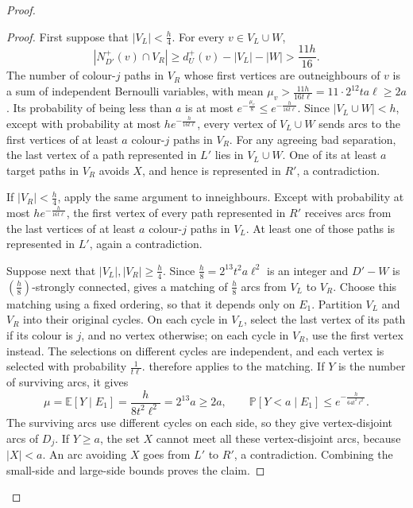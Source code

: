 \documentclass[11pt,a4paper]{article}
\theoremstyle{remark}
\numberwithin{equation}{section}
\newcommand{\Prob}{\mathbb{P}}
\newcommand{\E}{\mathbb{E}}
\begin{document}
\begin{proof}
\begin{proof}
			First suppose that $|V_L|<\frac{h}{4}$.
			For every $v\in V_L\cup W$,
			\[
			|N_{D'}^+(v)\cap V_R|\ge d_U^+(v)-|V_L|-|W|>\frac{11h}{16}.
			\]
			The number of colour-$j$ paths in $V_R$ whose first vertices are outneighbours
			of $v$ is a sum of independent Bernoulli variables, with mean
			$\mu_v>\frac{11h}{16t\ell}=11\cdot2^{12}ta\ell\ge2a$.
			Its probability of being less than $a$ is at most
			$e^{-\frac{\mu_v}{8}}\le e^{-\frac{h}{16t\ell}}$.
			Since $|V_L\cup W|<h$, except with probability at most $he^{-\frac{h}{16t\ell}}$,
			every vertex of $V_L\cup W$ sends arcs to the first vertices of at least $a$
			colour-$j$ paths in $V_R$.
			For any agreeing bad separation, the last vertex of a path represented in
			$L'$ lies in $V_L\cup W$.
			One of its at least $a$ target paths in $V_R$ avoids $X$, and hence is
			represented in $R'$, a contradiction.
			
			If $|V_R|<\frac{h}{4}$, apply the same argument to inneighbours.
			Except with probability at most $he^{-\frac{h}{16t\ell}}$, the first vertex of every
			path represented in $R'$ receives arcs from the last vertices of at least $a$
			colour-$j$ paths in $V_L$.
			At least one of those paths is represented in $L'$, again a contradiction.
			
			Suppose next that $|V_L|,|V_R|\ge \frac{h}{4}$.
			Since $\frac{h}{8}=2^{13}t^2a\ell^2$ is an integer and $D'-W$ is $(\frac{h}{8})$-strongly
			connected,  gives a matching of $\frac{h}{8}$ arcs from $V_L$ to $V_R$.
			Choose this matching using a fixed ordering, so that it depends only on
			$E_1$.
			Partition $V_L$ and $V_R$ into their original cycles.
			On each cycle in $V_L$, select the last vertex of its path if its colour is $j$,
			and no vertex otherwise; on each cycle in $V_R$, use the first vertex instead.
			The selections on different cycles are independent, and each vertex is selected
			with probability $\frac{1}{t\ell}$.
			 therefore applies to the matching.
			If $Y$ is the number of surviving arcs, it gives
			\[
			\mu=\E\!\left[Y\mid E_1\right]=\frac{h}{8t^2\ell^2}=2^{13}a\ge2a,
			\qquad
			\Prob\!\left[Y<a\mid E_1\right]\le e^{-\frac{h}{64t^2\ell^2}}.
			\]
			The surviving arcs use different cycles on each side, so they give
			vertex-disjoint arcs of $D_j$.
			If $Y\ge a$, the set $X$ cannot meet all these vertex-disjoint arcs, because
			$|X|<a$.
			An arc avoiding $X$ goes from $L'$ to $R'$, a contradiction.
			Combining the small-side and large-side bounds proves the claim.
		\end{proof}
		

\end{proof}
\end{document}

